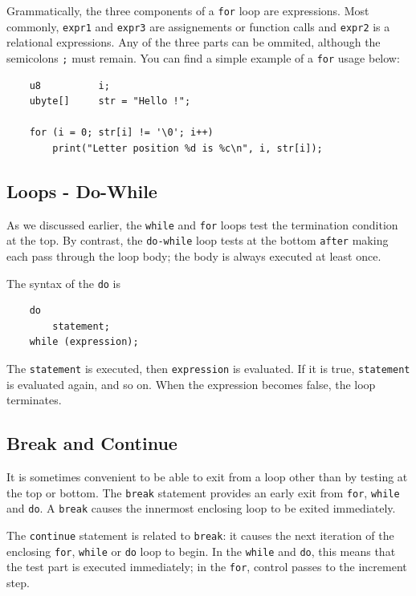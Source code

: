 \documentclass{scrartcl}
\begin{document}
            Grammatically, the three components of a \texttt{for} loop are
            expressions. Most commonly, \texttt{expr1} and \texttt{expr3} are
            assignements or function calls and \texttt{expr2} is a relational
            expressions. Any of the three parts can be ommited, although the 
            semicolons \texttt{;} must remain. You can find a simple example
            of a \texttt{for} usage below:
            \begin{lstlisting}
    u8          i;
    ubyte[]     str = "Hello !";

    for (i = 0; str[i] != '\0'; i++)
        print("Letter position %d is %c\n", i, str[i]);
            \end{lstlisting}
        \subsection{Loops - Do-While}
            As we discussed earlier, the \texttt{while} and \texttt{for} loops
            test the termination condition at the top. By contrast, the \texttt{do-while}
            loop tests at the bottom \texttt{after} making each pass through the 
            loop body; the body is always executed at least once.

            The syntax of the \texttt{do} is
            \begin{lstlisting}
    do
        statement;
    while (expression);
            \end{lstlisting}
            The \texttt{statement} is executed, then \texttt{expression} is
            evaluated. If it is true, \texttt{statement} is evaluated again, and so on.
            When the expression becomes false, the loop terminates.
        \subsection{Break and Continue} \label{break_n_continue}
            It is sometimes convenient to be able to exit from a loop other than
            by testing at the top or bottom. The \texttt{break} statement provides
            an early exit from \texttt{for}, \texttt{while} and \texttt{do}.
            A \texttt{break} causes the innermost enclosing loop to be exited
            immediately.

            The \texttt{continue} statement is related to \texttt{break}: it
            causes the next iteration of the enclosing \texttt{for}, \texttt{while} or
            \texttt{do} loop to begin. In the \texttt{while} and \texttt{do}, this means
            that the test part is executed immediately; in the \texttt{for}, control
            passes to the increment step.
\end{document}
